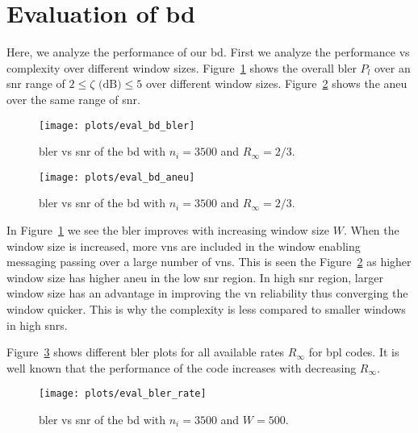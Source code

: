 \section{Evaluation of \acrlong{bd}}
Here, we analyze the performance of our \gls{bd}. First we analyze the performance vs complexity over different window sizes. Figure~\ref{fig:eval_bd_bler} shows the overall \gls{bler} $P_l$ over an \gls{snr} range of $2\leq\zeta\text{ (dB)}\leq 5$ over different window sizes. Figure~\ref{fig:eval_bd_aneu} shows the \gls{aneu} over the same range of \gls{snr}.
\begin{figure}[htbp]
  \centering
  \texttt{[image: plots/eval\_bd\_bler]}
  \caption{\gls{bler} vs \gls{snr} of the \acrfull{bd} with $n_i=3500$ and $R_\infty=2/3$.}
  \label{fig:eval_bd_bler}
\end{figure}
\begin{figure}[htbp]
   \centering
  \texttt{[image: plots/eval\_bd\_aneu]}
  \caption{\gls{bler} vs \gls{snr} of the \acrfull{bd} with $n_i=3500$ and $R_\infty=2/3$.}
  \label{fig:eval_bd_aneu}
\end{figure}

In Figure~\ref{fig:eval_bd_bler} we see the \gls{bler} improves with increasing window size $W$. When the window size is increased, more \glspl{vn} are included in the window enabling messaging passing over a large number of \glspl{vn}. This is seen the Figure~\ref{fig:eval_bd_aneu} as higher window size has higher \gls{aneu} in the low \gls{snr} region. In high \gls{snr} region, larger window size has an advantage in improving the \gls{vn} reliability thus converging the window quicker. This is why the complexity is less compared to smaller windows in high \glspl{snr}.

Figure~\ref{fig:eval_bler_rate} shows different \gls{bler} plots for all available rates $R_\infty$ for \gls{bpl} codes. It is well known that the performance of the code increases with decreasing $R_\infty$.
\begin{figure}[htbp]
  \centering
  \texttt{[image: plots/eval\_bler\_rate]}
  \caption{\gls{bler} vs \gls{snr} of the \acrfull{bd} with $n_i=3500$ and $W=500$.}
  \label{fig:eval_bler_rate}
\end{figure}


